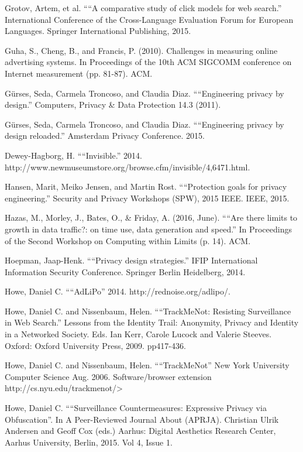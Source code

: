 \documentclass[conference]{IEEEtran}
\begin{document}
\begin{thebibliography}{99}
 Grotov, Artem, et al. ““A comparative study of click models for web search.” International Conference of the Cross-Language Evaluation Forum for European Languages. Springer International Publishing, 2015.

 Guha, S., Cheng, B., and Francis, P. (2010). Challenges in measuring online advertising systems. In Proceedings of the 10th ACM SIGCOMM conference on Internet measurement (pp. 81-87). ACM.

 Gürses, Seda, Carmela Troncoso, and Claudia Diaz. ““Engineering privacy by design.” Computers, Privacy \& Data Protection 14.3 (2011).

 Gürses, Seda, Carmela Troncoso, and Claudia Diaz. ““Engineering privacy by design reloaded.” Amsterdam Privacy Conference. 2015.

 Dewey-Hagborg, H. ““Invisible.” 2014.\\ http://www.newmuseumstore.org/browse.cfm/invisible/4,6471.html.

 Hansen, Marit, Meiko Jensen, and Martin Rost. ““Protection goals for privacy engineering.” Security and Privacy Workshops (SPW), 2015 IEEE. IEEE, 2015.

 Hazas, M., Morley, J., Bates, O., \& Friday, A. (2016, June). ““Are there limits to growth in data traffic?: on time use, data generation and speed.” In Proceedings of the Second Workshop on Computing within Limits (p. 14). ACM.

 Hoepman, Jaap-Henk. ““Privacy design strategies.” IFIP International Information Security Conference. Springer Berlin Heidelberg, 2014.

 Howe, Daniel C. ““AdLiPo” 2014. http://rednoise.org/adlipo/.

 Howe, Daniel C. and Nissenbaum, Helen. ““TrackMeNot: Resisting Surveillance in Web Search.” Lessons from the Identity Trail: Anonymity, Privacy and Identity in a Networked Society. Eds. Ian Kerr, Carole Lucock and Valerie Steeves. Oxford: Oxford University Press, 2009. pp417-436.

 Howe, Daniel C. and Nissenbaum, Helen. ““TrackMeNot” New York University Computer Science Aug. 2006. Software/browser extension http://cs.nyu.edu/trackmenot/>

 Howe, Daniel C. ““Surveillance Countermeasures: Expressive Privacy via Obfuscation”. In A Peer-Reviewed Journal About (APRJA). Christian Ulrik Andersen and Geoff Cox (eds.) Aarhus: Digital Aesthetics Research Center, Aarhus University, Berlin, 2015. Vol 4, Issue 1.


\end{thebibliography}
\end{document}
